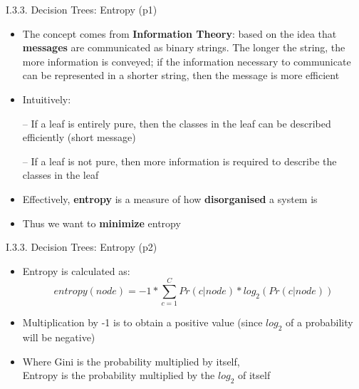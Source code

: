 \documentclass[handout]{beamer}
\newcommand{\strong}[1]{\textbf{\color{teal} #1}}
\newcommand{\stronger}[1]{\textbf{\color{purple} #1}}
\begin{document}
\begin{frame}{I.3.3. Decision Trees: Entropy (p1)}
\begin{itemize}
\item The concept comes from \strong{Information Theory}:
based on the idea that \textbf{messages} are communicated as binary strings.
The longer the string, the more information is conveyed; if the information necessary to communicate can be represented in a shorter string, then the message is more efficient
\item Intuitively:
\item[--] If a leaf is entirely pure, then the classes in the leaf can be described efficiently (short message)
\item[--] If a leaf is not pure, then more information is required to describe the classes in the leaf
\item Effectively, \strong{entropy} is a measure of how \stronger{disorganised} a system is
\item Thus we want to \stronger{minimize} entropy
\end{itemize}
\end{frame}
\begin{frame}{I.3.3. Decision Trees: Entropy (p2)}
\begin{itemize}
\item Entropy is calculated as:
\[
	entropy(node) = -1 * \sum_{c=1}^{C} Pr(c|node) * log_2( Pr(c|node) )
\]
\item Multiplication by -1 is to obtain a positive value (since $log_2$ of a probability will be negative)
\item Where Gini is the probability multiplied by itself,\\
Entropy is the probability multiplied by the $log_2$ of itself
\end{itemize}
\end{frame}
\end{document}
